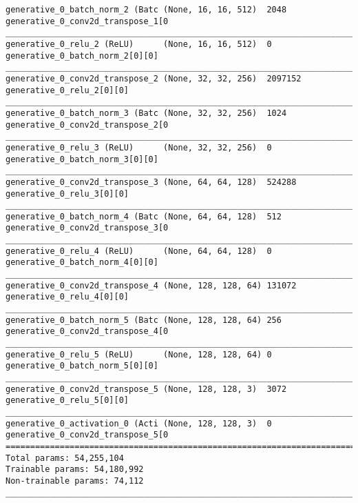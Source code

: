 \begin{lstlisting}[caption={CelebA-VLAE-GAN Decoder},captionpos=b,basicstyle=\tiny, label={lst:mnist-vlae-gan-decoder}]
generative_0_batch_norm_2 (Batc (None, 16, 16, 512)  2048        generative_0_conv2d_transpose_1[0
__________________________________________________________________________________________________
generative_0_relu_2 (ReLU)      (None, 16, 16, 512)  0           generative_0_batch_norm_2[0][0]
__________________________________________________________________________________________________
generative_0_conv2d_transpose_2 (None, 32, 32, 256)  2097152     generative_0_relu_2[0][0]
__________________________________________________________________________________________________
generative_0_batch_norm_3 (Batc (None, 32, 32, 256)  1024        generative_0_conv2d_transpose_2[0
__________________________________________________________________________________________________
generative_0_relu_3 (ReLU)      (None, 32, 32, 256)  0           generative_0_batch_norm_3[0][0]
__________________________________________________________________________________________________
generative_0_conv2d_transpose_3 (None, 64, 64, 128)  524288      generative_0_relu_3[0][0]
__________________________________________________________________________________________________
generative_0_batch_norm_4 (Batc (None, 64, 64, 128)  512         generative_0_conv2d_transpose_3[0
__________________________________________________________________________________________________
generative_0_relu_4 (ReLU)      (None, 64, 64, 128)  0           generative_0_batch_norm_4[0][0]
__________________________________________________________________________________________________
generative_0_conv2d_transpose_4 (None, 128, 128, 64) 131072      generative_0_relu_4[0][0]
__________________________________________________________________________________________________
generative_0_batch_norm_5 (Batc (None, 128, 128, 64) 256         generative_0_conv2d_transpose_4[0
__________________________________________________________________________________________________
generative_0_relu_5 (ReLU)      (None, 128, 128, 64) 0           generative_0_batch_norm_5[0][0]
__________________________________________________________________________________________________
generative_0_conv2d_transpose_5 (None, 128, 128, 3)  3072        generative_0_relu_5[0][0]
__________________________________________________________________________________________________
generative_0_activation_0 (Acti (None, 128, 128, 3)  0           generative_0_conv2d_transpose_5[0
==================================================================================================
Total params: 54,255,104
Trainable params: 54,180,992
Non-trainable params: 74,112
__________________________________________________________________________________________________
\end{lstlisting}